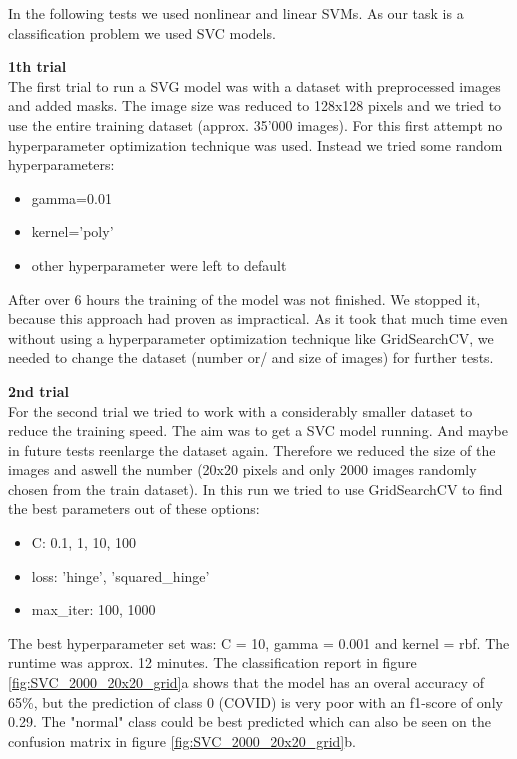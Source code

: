 \documentclass{article}
\begin{document}
In the following tests we used nonlinear and linear SVMs. As our task  is a classification problem we used SVC models.

\textbf{1th trial}\\
The first trial to run a SVG model was with a dataset with preprocessed images and added masks. The image size was reduced to 128x128 pixels and we tried 
to use the entire training dataset (approx. 35'000 images). For this first attempt no hyperparameter optimization technique was used. Instead we tried some random 
hyperparameters: 
\begin{itemize}
    \item gamma=0.01
    \item kernel='poly'
    \item other hyperparameter were left to default
\end{itemize}
After over 6 hours the training of the model was not finished. We stopped it, because this approach had proven as impractical. As it took that much time even without
using a hyperparameter optimization technique like GridSearchCV, we needed to change the dataset (number or/ and size of images) for further tests.


\textbf{2nd trial}\\
For the second trial we tried to work with a considerably smaller dataset to reduce the training speed. The aim was to get a SVC model running. And maybe in future 
tests reenlarge the dataset again. Therefore we reduced the size of the images and aswell the number (20x20 pixels and only 2000 images randomly chosen from the train 
dataset). In this run we tried to use GridSearchCV to find the best parameters out of these options: 
\begin{itemize}
    \item C: 0.1, 1, 10, 100
    \item loss: 'hinge', 'squared\_hinge'
    \item max\_iter: 100, 1000
\end{itemize}

The best hyperparameter set was: C = 10,  gamma = 0.001 and kernel = rbf. The runtime was approx. 12 minutes. The classification report in figure 
\ref{fig:SVC_2000_20x20_grid}a shows that the model has an overal accuracy of 65\%, but the prediction of class 0 (COVID) is very poor with an f1-score of only 0.29. The "normal" class could be best 
predicted which can also be seen on the confusion matrix in figure \ref{fig:SVC_2000_20x20_grid}b.
\end{document}
